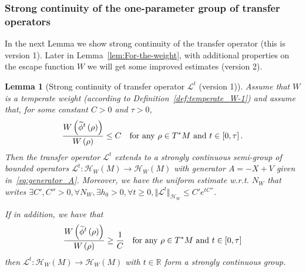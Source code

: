 \documentclass[10pt]{amsart}
\newtheorem{lemm}[theo]{Lemma}\newtheorem{prop}[theo]{Proposition}\newtheorem{coro}[theo]{Corollary}\newtheorem{conj}[theo]{Conjecture}
\theoremstyle{definition}\newtheorem{defi}[theo]{Definition}\newtheorem{rema}[theo]{Remark}\newtheorem{exam}[theo]{Example}\newtheorem{exem}[theo]{Example}\newtheorem{nota}[theo]{Notation}
\newcommand{\clH}{\mathcal{H}}
\newcommand{\clL}{\mathcal{L}}
\newcommand{\bbR}{\mathbb{R}}
\let\oldtilde\tilde
\renewcommand*{\tilde}[1]{\mathchoice{\widetilde{#1}}{\widetilde{#1}}{\oldtilde{#1}}{\oldtilde{#1}}}
\let\oldexists\exists
\renewcommand*{\exists}{\mathrel{\oldexists}}
\let\oldforall\forall
\renewcommand*{\forall}{\mathrel{\oldforall}}
\begin{document}
\subsubsection{Strong continuity of the one-parameter group of transfer operators}\label{subsec:Strongly-continuous-semi-group}

In the next Lemma we show strong continuity of the transfer operator (this is version 1). Later in Lemma~\ref{lem:For-the-weight}, with additional properties on the escape function $W$ we will get some improved estimates (version 2).

\begin{cBoxB}{}
\begin{lemm}[Strong continuity of transfer operator $\clL^{t}$ (version 1)]\label{lem:semi_group}
Assume that $W$ is a temperate weight (according to Definition~\ref{def:temperate_W-1}) and assume that, for some constant $C>0$ and $\tau>0$,
\begin{equation}\label{eq:bound_C}
\frac{W\left(\tilde{\phi}^{t}\left(\rho\right)\right)}{W\left(\rho\right)}\leq C\quad\text{for any }\rho\in T^{*}M\text{ and }t\in\left[0,\tau\right].
\end{equation}
Then the transfer operator $\clL^{t}$ extends to a strongly continuous semi-group of bounded operators $\clL^{t}:\clH _{W}(M)\rightarrow\clH _{W}(M)$ with generator $A=-X+V$ given in~\eqref{eq:generator_A}. Moreover, we have the uniform estimate w.r.t. $N_{W}$ that writes $\exists C',C''>0,\forall N_{W},\exists h_{0}>0,\forall t\geq0,\Vert \clL^{t}\Vert _{\clH _{W}}\leq C'e^{tC''}$.

If in addition, we have that
\begin{equation}
\frac{W\left(\tilde{\phi}^{t}\left(\rho\right)\right)}{W\left(\rho\right)}\geq\frac{1}{C}\quad\text{for any }\rho\in T^{*}M\text{ and }t\in\left[0,\tau\right]\label{eq:estim2}
\end{equation}
then $\clL^{t}:\clH _{W}(M)\rightarrow\clH _{W}(M)$ with $t\in\bbR$ form a strongly continuous group.
\end{lemm}
\end{cBoxB}
\end{document}
